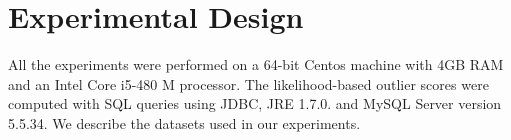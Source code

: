 					
					
													
			\section{Experimental Design}
			All the experiments were performed on a 64-bit Centos machine with 4GB RAM and an Intel Core i5-480 M processor. The likelihood-based outlier scores were computed with SQL queries using JDBC, JRE 1.7.0. and MySQL Server version 5.5.34.
			We describe the datasets used in our experiments.
			
%			
%			
%			
%			
%			
%			
%			
